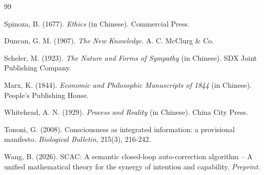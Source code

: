 \documentclass[12pt,a4paper]{article}
\theoremstyle{plain}
\begin{document}
\begin{thebibliography}{99}

Spinoza, B. (1677). \textit{Ethics} (in Chinese). Commercial Press.

Duncan, G. M. (1907). \textit{The New Knowledge}. A. C. McClurg \& Co.

Scheler, M. (1923). \textit{The Nature and Forms of Sympathy} (in Chinese). SDX Joint Publishing Company.

Marx, K. (1844). \textit{Economic and Philosophic Manuscripts of 1844} (in Chinese). People's Publishing House.

Whitehead, A. N. (1929). \textit{Process and Reality} (in Chinese). China City Press.

Tononi, G. (2008). Consciousness as integrated information: a provisional manifesto. \textit{Biological Bulletin}, 215(3), 216-242.

Wang, B. (2026). SCAC: A semantic closed-loop auto-correction algorithm – A unified mathematical theory for the synergy of intention and capability. \textit{Preprint}.

\end{thebibliography}
\end{document}
